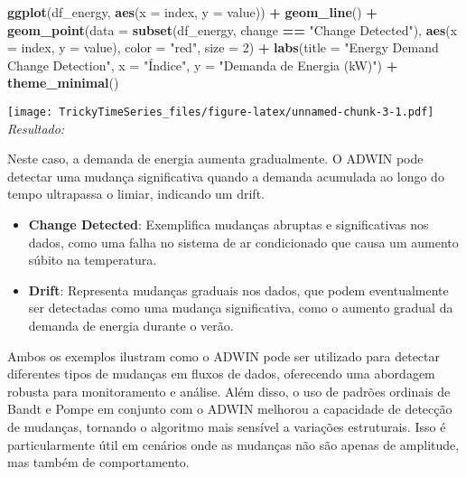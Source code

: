 \documentclass[
]{article}
\newenvironment{Shaded}{\begin{snugshade}}{\end{snugshade}}
\newcommand{\AttributeTok}[1]{\textcolor[rgb]{0.13,0.29,0.53}{#1}}
\newcommand{\DecValTok}[1]{\textcolor[rgb]{0.00,0.00,0.81}{#1}}
\newcommand{\FunctionTok}[1]{\textcolor[rgb]{0.13,0.29,0.53}{\textbf{#1}}}
\newcommand{\NormalTok}[1]{#1}
\newcommand{\SpecialCharTok}[1]{\textcolor[rgb]{0.81,0.36,0.00}{\textbf{#1}}}
\newcommand{\StringTok}[1]{\textcolor[rgb]{0.31,0.60,0.02}{#1}}
\begin{document}
\begin{Shaded}
\begin{Highlighting}[]
\FunctionTok{ggplot}\NormalTok{(df\_energy, }\FunctionTok{aes}\NormalTok{(}\AttributeTok{x =}\NormalTok{ index, }\AttributeTok{y =}\NormalTok{ value)) }\SpecialCharTok{+}
  \FunctionTok{geom\_line}\NormalTok{() }\SpecialCharTok{+}
  \FunctionTok{geom\_point}\NormalTok{(}\AttributeTok{data =} \FunctionTok{subset}\NormalTok{(df\_energy, change }\SpecialCharTok{==} \StringTok{"Change Detected"}\NormalTok{), }\FunctionTok{aes}\NormalTok{(}\AttributeTok{x =}\NormalTok{ index, }\AttributeTok{y =}\NormalTok{ value), }\AttributeTok{color =} \StringTok{"red"}\NormalTok{, }\AttributeTok{size =} \DecValTok{2}\NormalTok{) }\SpecialCharTok{+}
  \FunctionTok{labs}\NormalTok{(}\AttributeTok{title =} \StringTok{"Energy Demand Change Detection"}\NormalTok{, }\AttributeTok{x =} \StringTok{"Índice"}\NormalTok{, }\AttributeTok{y =} \StringTok{"Demanda de Energia (kW)"}\NormalTok{) }\SpecialCharTok{+}
  \FunctionTok{theme\_minimal}\NormalTok{()}
\end{Highlighting}
\end{Shaded}

\texttt{[image: TrickyTimeSeries\_files/figure-latex/unnamed-chunk-3-1.pdf]}
\emph{Resultado:}

Neste caso, a demanda de energia aumenta gradualmente. O ADWIN pode
detectar uma mudança significativa quando a demanda acumulada ao longo
do tempo ultrapassa o limiar, indicando um drift.

\begin{itemize}
\item
  \textbf{Change Detected}: Exemplifica mudanças abruptas e
  significativas nos dados, como uma falha no sistema de ar condicionado
  que causa um aumento súbito na temperatura.
\item
  \textbf{Drift}: Representa mudanças graduais nos dados, que podem
  eventualmente ser detectadas como uma mudança significativa, como o
  aumento gradual da demanda de energia durante o verão.
\end{itemize}

Ambos os exemplos ilustram como o ADWIN pode ser utilizado para detectar
diferentes tipos de mudanças em fluxos de dados, oferecendo uma
abordagem robusta para monitoramento e análise. Além disso, o uso de
padrões ordinais de Bandt e Pompe em conjunto com o ADWIN melhorou a
capacidade de detecção de mudanças, tornando o algoritmo mais sensível a
variações estruturais. Isso é particularmente útil em cenários onde as
mudanças não são apenas de amplitude, mas também de comportamento.
\end{document}
